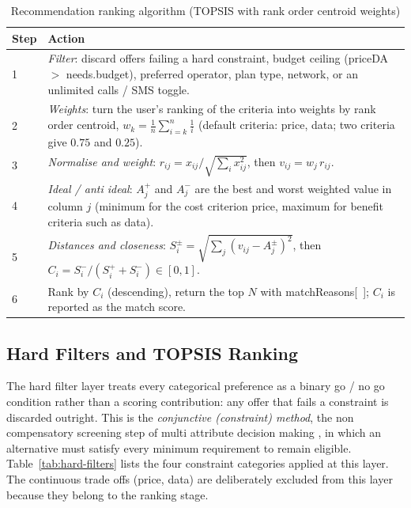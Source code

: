\begin{table}[H]
  \caption{Recommendation ranking algorithm (TOPSIS with rank order centroid weights)}
  \label{tab:rec-algo}
  \centering\small
  \begin{tabular}{|p{0.8cm}|p{12.5cm}|}
    \hline
    \textbf{Step} & \textbf{Action} \\
    \hline
    1  & \textit{Filter}: discard offers failing a hard constraint, budget ceiling (priceDA $>$ needs.budget), preferred operator, plan type, network, or an unlimited calls / SMS toggle. \\ \hline
    2  & \textit{Weights}: turn the user's ranking of the criteria into weights by rank order centroid, $w_k = \tfrac{1}{n}\sum_{i=k}^{n}\tfrac{1}{i}$ (default criteria: price, data; two criteria give $0.75$ and $0.25$). \\ \hline
    3  & \textit{Normalise and weight}: $r_{ij} = x_{ij}/\sqrt{\sum_i x_{ij}^2}$, then $v_{ij} = w_j\, r_{ij}$. \\ \hline
    4  & \textit{Ideal / anti ideal}: $A^{+}_j$ and $A^{-}_j$ are the best and worst weighted value in column $j$ (minimum for the cost criterion price, maximum for benefit criteria such as data). \\ \hline
    5  & \textit{Distances and closeness}: $S_i^{\pm} = \sqrt{\sum_j (v_{ij}-A^{\pm}_j)^2}$, then $C_i = S_i^{-}/(S_i^{+}+S_i^{-}) \in [0,1]$. \\ \hline
    6  & Rank by $C_i$ (descending), return the top $N$ with matchReasons[~]; $C_i$ is reported as the match score. \\ \hline
  \end{tabular}
\end{table}

\subsection{Hard Filters and TOPSIS Ranking}

The hard filter layer treats every categorical preference as a binary go / no go condition rather than a scoring contribution: any offer that fails a constraint is discarded outright. This is the \emph{conjunctive (constraint) method}, the non compensatory screening step of multi attribute decision making \parencite{HwangYoon1981}, in which an alternative must satisfy every minimum requirement to remain eligible. Table~\ref{tab:hard-filters} lists the four constraint categories applied at this layer. The continuous trade offs (price, data) are deliberately excluded from this layer because they belong to the ranking stage.

